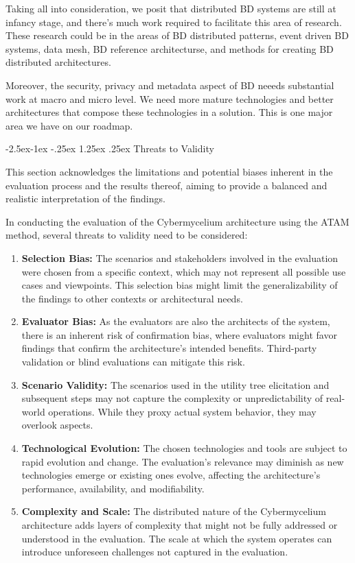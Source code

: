 \documentclass[review]{elsarticle}
\makeatletter
\renewcommand\paragraph{\@startsection{paragraph}{4}{\z@}%
            {-2.5ex\@plus -1ex \@minus -.25ex}%
            {1.25ex \@plus .25ex}%
            {\normalfont\normalsize\itshape}}
\makeatother
\begin{document}
Taking all into consideration, we posit that distributed BD systems are still at infancy stage, and there's much work required to facilitate this area of research. These research could be in the areas of BD distributed patterns, event driven BD systems, data mesh, BD reference architecturse, and methods for creating BD distributed architectures.

Moreover, the security, privacy and metadata aspect of BD neeeds substantial work at macro and micro level. We need more mature technologies and better architectures that compose these technologies in a solution. This is one major area we have on our roadmap.

\paragraph{Threats to Validity}

This section acknowledges the limitations and potential biases inherent in the evaluation process and the results thereof, aiming to provide a balanced and realistic interpretation of the findings.

In conducting the evaluation of the Cybermycelium architecture using the ATAM method, several threats to validity need to be considered:

\begin{enumerate}
    \item \textbf{Selection Bias:} The scenarios and stakeholders involved in the evaluation were chosen from a specific context, which may not represent all possible use cases and viewpoints. This selection bias might limit the generalizability of the findings to other contexts or architectural needs.
    \item \textbf{Evaluator Bias:} As the evaluators are also the architects of the system, there is an inherent risk of confirmation bias, where evaluators might favor findings that confirm the architecture's intended benefits. Third-party validation or blind evaluations can mitigate this risk.
    \item \textbf{Scenario Validity:} The scenarios used in the utility tree elicitation and subsequent steps may not capture the complexity or unpredictability of real-world operations. While they proxy actual system behavior, they may overlook aspects.
    \item \textbf{Technological Evolution:} The chosen technologies and tools are subject to rapid evolution and change. The evaluation's relevance may diminish as new technologies emerge or existing ones evolve, affecting the architecture's performance, availability, and modifiability.
    \item \textbf{Complexity and Scale:} The distributed nature of the Cybermycelium architecture adds layers of complexity that might not be fully addressed or understood in the evaluation. The scale at which the system operates can introduce unforeseen challenges not captured in the evaluation.
\end{enumerate}
\end{document}
